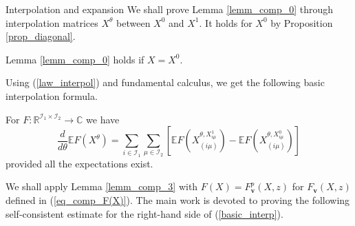 \begin{subsection}{Interpolation and expansion}
We shall prove Lemma \ref{lemm_comp_0} through interpolation matrices $X^\theta$ between $X^0$ and $X^1$. It holds for $X^0$ by Proposition \ref{prop_diagonal}.%
\begin{lemma}\label{Gaussian_case}
Lemma \ref{lemm_comp_0} holds if $X=X^0$.
\end{lemma}

Using (\ref{law_interpol}) and fundamental calculus, we get the following basic interpolation formula.
\begin{lemma}\label{lemm_comp_3}
 For $F:\mathbb R^{\mathcal I_1 \times\mathcal I_2}\rightarrow \mathbb C$ we have
\begin{equation}\label{basic_interp}
\frac{d}{d\theta}\mathbb E F(X^\theta)=\sum_{i\in\mathcal I_1}\sum_{\mu\in\mathcal I_2}\left[\mathbb E F\left(X^{\theta,X_{i\mu}^1}_{(i\mu)}\right)-\mathbb E F\left(X^{\theta,X_{i\mu}^0}_{(i\mu)}\right)\right]
\end{equation}
 provided all the expectations exist.
\end{lemma}

We shall apply Lemma \ref{lemm_comp_3} with $F(X)=F_{\mathbf v}^p(X,z)$ for $F_{\mathbf v}(X,z)$ defined in (\ref{eq_comp_F(X)}). The main work is devoted to proving the following self-consistent estimate for the right-hand side of (\ref{basic_interp}).


\end{subsection}

